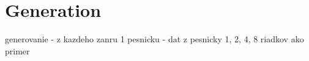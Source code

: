 \chapter{Generation}
 generovanie
-  z kazdeho zanru 1 pesnicku
- dat z pesnicky 1, 2, 4, 8 riadkov ako primer
